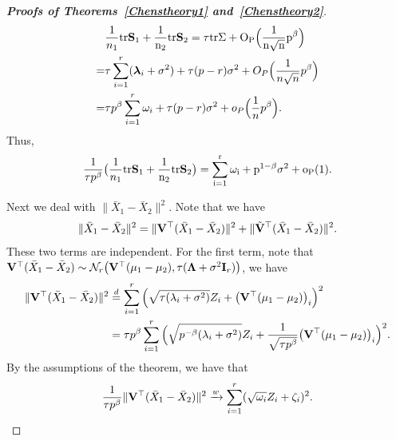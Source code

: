 \documentclass[times,sort&compress,3p]{elsarticle}
\newcommand{\mytr}{\rm tr}
\newcommand{\bfsym}[1]{\ensuremath{\boldsymbol{#1}}}
\def\blambda {\bfsym {\lambda}}        \def\bLambda {\bfsym {\Lambda}}
\theoremstyle{plain}
\theoremstyle{definition}
\theoremstyle{remark}
\begin{document}
\begin{appendices}
\begin{proof}[\textbf{Proofs of Theorems~\ref{Chenstheory1} and~\ref{Chenstheory2}}]
$$\begin{aligned}
        &\frac{1}{n_1}\mytr \BS_1+\frac{1}{n_2}\mytr \BS_2=
    \tau \mytr \bSigma+O_P\Big(\frac{1}{n\sqrt{n}}p^{\beta}\Big)\\
        =&\tau \sum_{i=1}^r (\blambda_i+\sigma^2)+\tau(p-r)\sigma^2+O_P\Big(\frac{1}{n\sqrt{n}}p^{\beta}\Big)\\
        =&\tau p^{\beta} \sum_{i=1}^r \omega_i+\tau(p-r)\sigma^2+o_P\Big(\frac{1}{n}p^{\beta}\Big).
    \end{aligned}
    $$
Thus,
        \begin{equation}\label{eq:kkk1}
        \frac{1}{\tau p^\beta}\big(\frac{1}{n_1}\mytr \BS_1+\frac{1}{n_2}\mytr \BS_2\big)
        =\sum_{i=1}^r \omega_i+p^{1-\beta}\sigma^2+o_P(1).
        \end{equation}

    Next we deal with $\|\bar{X}_1-\bar{X}_2\|^2$.
    Note that we have
    $$
    \|\bar{X}_1-\bar{X}_2\|^2=
    \|\mathbf{V}^\top (\bar{X}_1-\bar{X}_2)\|^2+
    \|\tilde{\mathbf{V}}^\top (\bar{X}_1-\bar{X}_2)\|^2.
    $$
    These two terms are independent.
    For the first term, note that $\BV^\top (\bar{X}_1-\bar{X}_2)\sim \mathcal{N}_r\big(\BV^\top  (\mu_1-\mu_2),\tau (\bLambda+\sigma^2 \BI_r)\big)$, we have
    $$
    \begin{aligned}
        \|\mathbf{V}^\top (\bar{X}_1-\bar{X}_2)\|^2&\overset{d}{=}
        \sum_{i=1}^r \Big(\sqrt{\tau (\lambda_i+\sigma^2)}Z_i+\big(\mathbf{V}^\top  (\mu_1-\mu_2)\big)_i \Big)^2\\
        &=\tau p^{\beta}
        \sum_{i=1}^r
        \Big( \sqrt{p^{-\beta}(\lambda_i+\sigma^2)}Z_i+\frac{1}{\sqrt{\tau p^{\beta}}}\big(\mathbf{V}^\top  (\mu_1-\mu_2)\big)_i \Big)^2.
    \end{aligned}
    $$
    By the assumptions of the theorem,  we have that
    \begin{equation}\label{eq:kkk2}
    \begin{aligned}
        \frac{1}{\tau p^{\beta}}\|\mathbf{V}^\top (\bar{X}_1-\bar{X}_2)\|^2
        \xrightarrow{w}
        \sum_{i=1}^r (\sqrt{\omega_i} Z_i+\zeta_i)^2.
    \end{aligned}
    \end{equation}


\end{proof}
\end{appendices}
\end{document}
